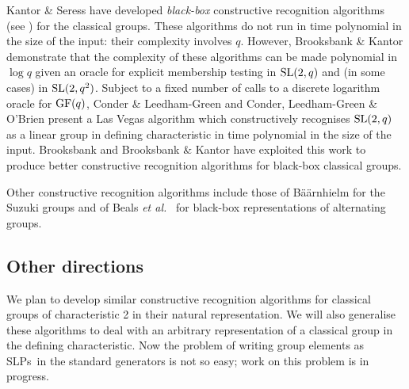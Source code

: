 \documentclass[12pt]{article}
\def\SL{{\rm SL}}
\def\GF{{\rm GF}}
\def\SLPs{{\rm SLPs}}
\begin{document}
Kantor \& Seress \cite{KantorSeress01} have developed  
{\it black-box} constructive recognition algorithms 
(see \cite[p.\ 17]{Seress03}) for 
the classical groups.  These algorithms do not run
in time polynomial in the size of the input:
their complexity involves $q$.
However, Brooksbank \& Kantor \cite{BK} demonstrate that
the complexity of these algorithms can be
made polynomial in $\log q$ given an oracle for explicit 
membership testing in $\SL(2,q)$ and
(in some cases) in $\SL(2,q^2)$.  
Subject to a fixed number of calls to a discrete logarithm oracle
for $\GF(q)$, Conder \& Leedham-Green \cite{ConderLeedhamGreen01} and
Conder, Leedham-Green \&
O'Brien \cite{Conderetal05} present a Las Vegas algorithm
which constructively recognises $\SL(2, q)$
as a linear group in defining characteristic
in time polynomial in the size of the input.
Brooksbank \cite{Brooksbank03a} and
Brooksbank \& Kantor \cite{BK, BK06} have exploited
this work to produce better constructive
recognition algorithms for black-box classical groups.

Other constructive recognition algorithms include those  of 
B\"a\"arnhielm \cite{HB} for the Suzuki groups and of 
Beals {\it et al.\ }\cite{BLNPS1} 
for black-box representations of alternating groups. 

\subsection{Other directions}
We plan to develop similar constructive recognition algorithms for 
classical groups of characteristic 2 in their natural representation.
We will also generalise these algorithms to deal with 
an arbitrary representation of a classical
group in the defining characteristic.  Now the 
problem of writing group elements as
\SLPs\ in the standard generators is not so easy; work on 
this problem is in progress.
\end{document}
